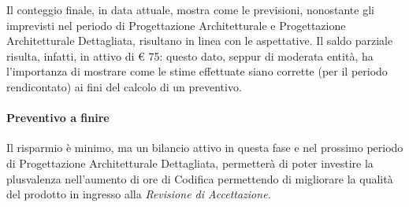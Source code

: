 Il conteggio finale, in data attuale, mostra come le previsioni, nonostante gli imprevisti nel periodo di Progettazione Architetturale e Progettazione Architetturale Dettagliata, risultano in linea con le aspettative. Il saldo parziale risulta, infatti, in attivo di € 75: questo dato, seppur di moderata entità, ha l'importanza di mostrare come le stime effettuate siano corrette (per il periodo rendicontato) ai fini del calcolo di un preventivo.

\paragraph{Preventivo a finire}
Il risparmio è minimo, ma un bilancio attivo in questa fase e nel prossimo periodo di Progettazione Architetturale Dettagliata, permetterà di poter investire la plusvalenza nell'aumento di ore di Codifica permettendo di migliorare la qualità del prodotto in ingresso alla \textit{Revisione di Accettazione.}
